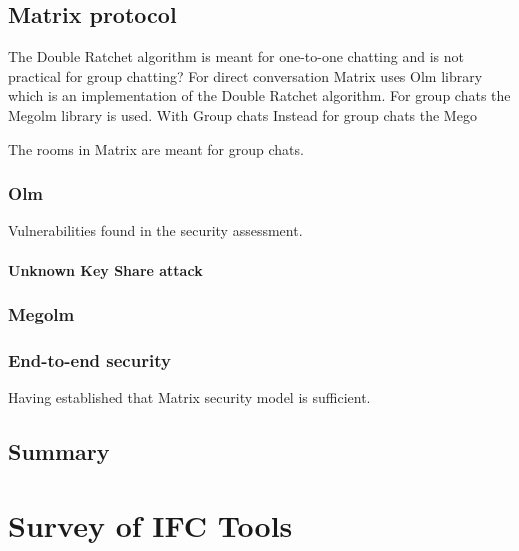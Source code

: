 \subsection{Matrix protocol}

The Double Ratchet algorithm is meant for one-to-one chatting and is not practical for group chatting? %
For direct conversation Matrix uses Olm library which is an implementation of the Double Ratchet algorithm. For group chats the Megolm library is used. With Group chats 
Instead for group chats the Mego

The rooms in Matrix are meant for group chats. 

\subsubsection{Olm}
Vulnerabilities found in the security assessment. 

\paragraph{Unknown Key Share attack}

\subsubsection{Megolm}

 
\subsubsection{End-to-end security}
Having established that Matrix security model is sufficient.

\subsection{Summary}





\section{Survey of IFC Tools}

